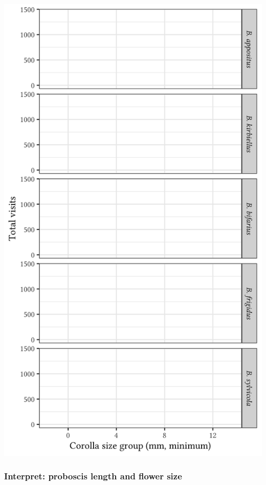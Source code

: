 \documentclass[12pt, hidelinks]{exam}
\begin{document}
\begin{questions}
	\includegraphics[height=\textheight]{flower_visits_blank}
\fi


\newpage





\subsubsection*{Interpret: proboscis length and flower size}


\end{questions}
\end{document}
